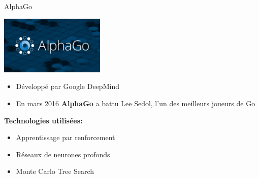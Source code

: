 

\begin{frame}{AlphaGo}
    \begin{center}

        \includegraphics[width=5cm]{ressources/AlphaGo/AlphaGoLogo}
    \end{center}
    \begin{block}{}
        \begin{itemize}
            \item Développé par Google DeepMind
            \item En mars 2016 \textbf{AlphaGo} a battu Lee Sedol, l'un des meilleurs joueurs de Go
        \end{itemize}
    \end{block}
    \begin{exampleblock}{}
        \textbf{Technologies utilisées:}
        \begin{itemize}
            \item Apprentissage par renforcement
            \item Réseaux de neurones profonds
            \item Monte Carlo Tree Search
        \end{itemize}
    \end{exampleblock}
\end{frame}



